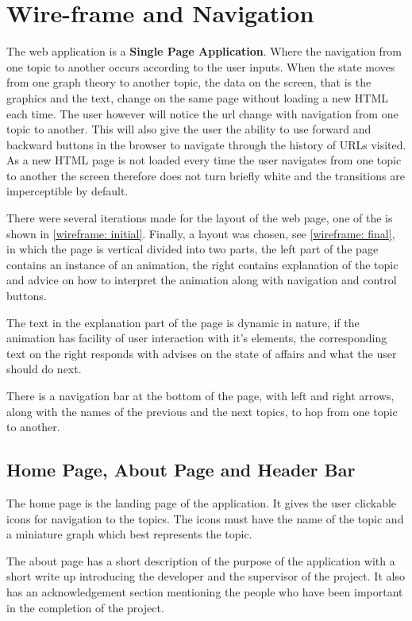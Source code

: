 \section{Wire-frame and Navigation}
The web application is a \textbf{Single Page Application}. Where the navigation
from one topic to another occurs according to the user inputs. When the state
moves from one graph theory to another topic, the data on the screen, that is
the graphics and the text, change on the same page without loading a new HTML
each time. The user however will notice the url change with navigation from one
topic to another. This will also give the user the ability to use forward and
backward buttons in the browser to navigate through the history of URLs
visited. As a new HTML page is not loaded every time the user navigates from
one topic to another the screen therefore does not turn briefly white and the
transitions are imperceptible by default.

There were several iterations made for the layout of the web page, one of the
is shown in \autoref{wireframe: initial}. Finally, a layout was chosen, see
\autoref{wireframe: final}, in which the page is vertical divided into two
parts, the left part of the page contains an instance of an animation, the
right contains explanation of the topic and advice on how to interpret the
animation along with navigation and control buttons. 

The text in the explanation part of the page is dynamic in nature, if the
animation has facility of user interaction with it's elements, the
corresponding text on the right responds with advises on the state of affairs
and what the user should do next.

There is a navigation bar at the bottom of the page, with left and right
arrows, along with the names of the previous and the next topics, to hop from
one topic to another.

\subsection{Home Page, About Page and Header Bar}
\label{design: home}
The home page is the landing page of the application. It gives the user
clickable icons for navigation to the topics. The icons must have the name of
the topic and a miniature graph which best represents the topic. 

The about page has a short description of the purpose of the application with a
short write up introducing the developer and the supervisor of the project. It
also has an acknowledgement section mentioning the people who have been important
in the completion of the project.

